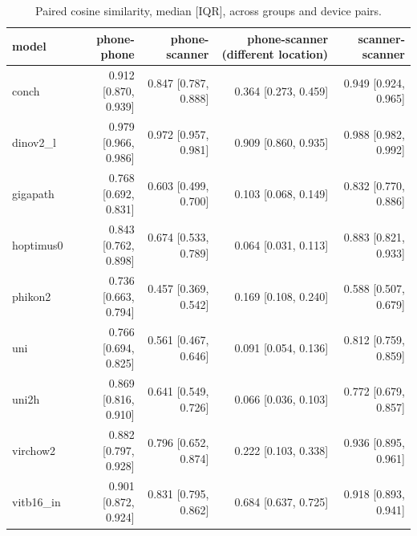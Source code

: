 \begin{table}[t]
\centering
\small
\begin{tabular}{lrrrr}
\toprule
model & phone-phone & phone-scanner & phone-scanner (different location) & scanner-scanner \\
\midrule
conch & 0.912 [0.870, 0.939] & 0.847 [0.787, 0.888] & 0.364 [0.273, 0.459] & 0.949 [0.924, 0.965] \\
dinov2\_l & 0.979 [0.966, 0.986] & 0.972 [0.957, 0.981] & 0.909 [0.860, 0.935] & 0.988 [0.982, 0.992] \\
gigapath & 0.768 [0.692, 0.831] & 0.603 [0.499, 0.700] & 0.103 [0.068, 0.149] & 0.832 [0.770, 0.886] \\
hoptimus0 & 0.843 [0.762, 0.898] & 0.674 [0.533, 0.789] & 0.064 [0.031, 0.113] & 0.883 [0.821, 0.933] \\
phikon2 & 0.736 [0.663, 0.794] & 0.457 [0.369, 0.542] & 0.169 [0.108, 0.240] & 0.588 [0.507, 0.679] \\
uni & 0.766 [0.694, 0.825] & 0.561 [0.467, 0.646] & 0.091 [0.054, 0.136] & 0.812 [0.759, 0.859] \\
uni2h & 0.869 [0.816, 0.910] & 0.641 [0.549, 0.726] & 0.066 [0.036, 0.103] & 0.772 [0.679, 0.857] \\
virchow2 & 0.882 [0.797, 0.928] & 0.796 [0.652, 0.874] & 0.222 [0.103, 0.338] & 0.936 [0.895, 0.961] \\
vitb16\_in & 0.901 [0.872, 0.924] & 0.831 [0.795, 0.862] & 0.684 [0.637, 0.725] & 0.918 [0.893, 0.941] \\
\bottomrule
\end{tabular}
\caption{Paired cosine similarity, median [IQR], across groups and device pairs.}
\label{tab:paired}
\end{table}
